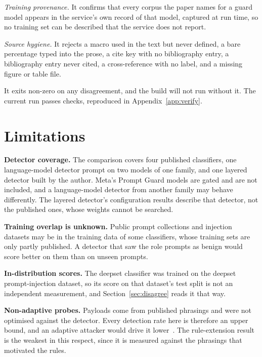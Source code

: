 \documentclass[conference]{IEEEtran}
\begin{document}
\emph{Training provenance.} It confirms that every corpus the paper names for a
guard model appears in the service's own record of that model, captured at run
time, so no training set can be described that the service does not report.

\emph{Source hygiene.} It rejects a macro used in the text but never defined, a
bare percentage typed into the prose, a cite key with no bibliography entry, a
bibliography entry never cited, a cross-reference with no label, and a missing
figure or table file.

It exits non-zero on any disagreement, and the build will not run without it.
The current run passes \NVerifyChecks{} checks, reproduced in
Appendix~\ref{app:verify}.

\section{Limitations}\label{sec:limits}

\textbf{Detector coverage.} The comparison covers four published
classifiers, one language-model detector prompt on two models of one family,
and one layered detector built by the author. Meta's Prompt Guard models are
gated and are not included, and a language-model detector from another family
may behave differently. The layered detector's configuration results describe
that detector, not the published ones, whose weights cannot be searched.

\textbf{Training overlap is unknown.} Public prompt collections and
injection datasets may be in the training data of some classifiers, whose
training sets are only partly published. A detector that saw the role
prompts as benign would score better on them than on unseen prompts.

\textbf{In-distribution scores.} The deepset classifier was trained on the
deepset prompt-injection dataset, so its score on that dataset's test split is
not an independent measurement, and Section~\ref{sec:disagree} reads it that
way.

\textbf{Non-adaptive probes.} Payloads come from published phrasings and were
not optimised against the detector. Every detection rate here is therefore an
upper bound, and an adaptive attacker would drive it
lower~\cite{nasr2025adaptive}. The rule-extension result is the weakest in this
respect, since it is measured against the phrasings that motivated the
rules.
\end{document}
